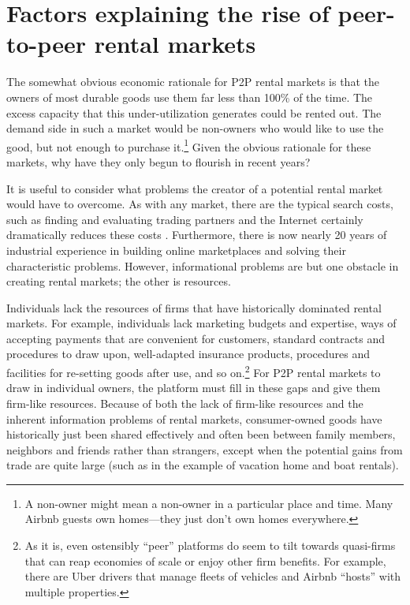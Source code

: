\documentclass[11pt]{article}
\begin{document}



\section{Factors explaining the rise of peer-to-peer rental markets}

The somewhat obvious economic rationale for P2P rental markets is that the owners of most durable goods use them far less than 100\% of the time.
The excess capacity that this under-utilization generates could be rented out.
The demand side in such a market would be non-owners who would like to use the good, but not enough to purchase it.\footnote{
A non-owner might mean a non-owner in a particular place and time. 
Many Airbnb guests own homes---they just don't own homes everywhere. 
} 
Given the obvious rationale for these markets, why have they only begun to flourish in recent years? 

It is useful to consider what problems the creator of a potential rental market would have to overcome.
As with any market, there are the typical search costs, such as finding and evaluating trading partners and the Internet certainly dramatically reduces these costs \citep{bakos1997reducing}.
Furthermore, there is now nearly 20 years of industrial experience in building online marketplaces and solving their characteristic problems. 
However, informational problems are but one obstacle in creating rental markets; the other is resources. 


Individuals lack the resources of firms that have historically dominated rental markets. 
For example, individuals lack marketing budgets and expertise, ways of accepting payments that are convenient for customers, standard contracts and procedures to draw upon, well-adapted insurance products, procedures and facilities for re-setting goods after use, and so on.\footnote{
  As it is, even ostensibly ``peer'' platforms do seem to tilt towards quasi-firms that can reap economies of scale or enjoy other firm benefits.
  For example, there are Uber drivers that manage fleets of vehicles and Airbnb ``hosts'' with multiple properties. 
  }
For P2P rental markets to draw in individual owners, the platform must fill in these gaps and give them firm-like resources. 
Because of both the lack of firm-like resources and the inherent information problems of rental markets, consumer-owned goods have historically just been shared effectively and often been between family members, neighbors and friends rather than strangers, except when the potential gains from trade are quite large (such as in the example of vacation home and boat rentals). 
\end{document}
